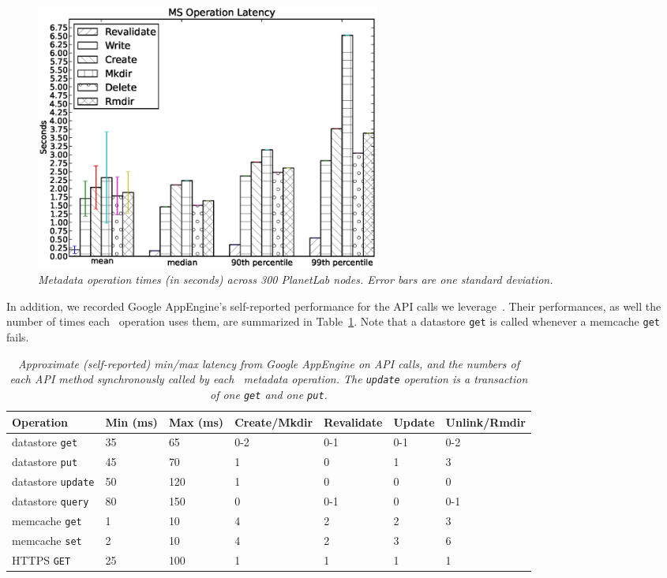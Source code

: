 \begin{figure}[h!]
\centerline{\includegraphics[width=0.55\textwidth]{figures/metadata_operations}}
\caption{\it 
Metadata operation times (in seconds) across 300 PlanetLab nodes.  Error bars are one standard deviation.}
\label{fig:metadata-latency}
\end{figure}

In addition, we recorded Google AppEngine's self-reported
performance for the API calls we leverage~\cite{google-appengine-status}.
Their performances, as well the number of times each \MS\ operation uses them,
are summarized in Table~\ref{tab:gae-performance}.  Note that a datastore {\tt get} 
is called whenever a memcache {\tt get} fails.

\begin{table}[ht!]
\begin{tabular}{ | l | l | l | l | l | l | l |}
\hline
\textbf{Operation} & \textbf{Min (ms)} & \textbf{Max (ms)} & \textbf{Create/Mkdir} & \textbf{Revalidate} & \textbf{Update} & \textbf{Unlink/Rmdir} \\
\hline
datastore {\tt get}    & 35  & 65  & 0-2 & 0-1 & 0-1 & 0-2 \\
datastore {\tt put}    & 45  & 70  & 1   & 0   & 1   & 3 \\
datastore {\tt update} & 50 & 120  & 1   & 0   & 0   & 0 \\
datastore {\tt query}  & 80 & 150  & 0   & 0-1 & 0   & 0-1 \\
memcache {\tt get}     & 1  & 10   & 4   & 2   & 2   & 3 \\
memcache {\tt set}     & 2  & 10   & 4   & 2   & 3   & 6 \\
HTTPS {\tt GET}        & 25 & 100  & 1   & 1   & 1   & 1 \\
\hline
\end{tabular}
\caption{\it Approximate (self-reported) min/max latency from Google AppEngine on
API calls, and the numbers of each API method synchronously
called by each \Syndicate\ metadata operation. The {\tt update}
operation is a transaction of one {\tt get} and one {\tt put}. }
\label{tab:gae-performance}
\end{table}

